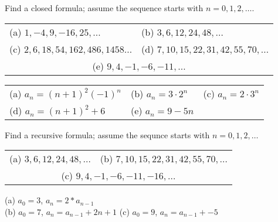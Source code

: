 \documentclass[11pt,addpoints]{exam}
\begin{document}
\begin{questions}
\question[10] Find a closed formula; assume the sequence starts with $n=0, 1, 2, \ldots$.

\begin{tabular}{ll}
	(a) $1, -4, 9, -16, 25, \ldots$ 
		& (b) $3, 6, 12, 24, 48, \ldots$ \\
	(c) $2, 6, 18, 54, 162, 486, 1458\ldots$  \hspace{0.3in}
		& (d) $7, 10, 15, 22, 31, 42, 55, 70, \ldots$ \\
	\multicolumn{2}{c}{(e) $9, 4, -1, -6, -11, \ldots$ }
\end{tabular}
    \ifprintanswers
        \vspace{-10pt}
   \fi
\begin{solution}
	
	\begin{tabular}{lll}
		(a) $a_n = (n+1)^2 (-1)^n$ \hspace{0.6in}
			& (b) $a_n = 3\cdot 2^n$ \hspace{0.6in}
			& (c) $a_n = 2\cdot 3^n$ \\
		(d) $a_n = (n+1)^2 + 6$
			& (e) $a_n = 9 - 5n$
	\end{tabular}
\end{solution}


\question[6] Find a recursive formula; assume the sequnce starts with $n=0,1,2,\ldots$

\begin{tabular}{ll}
	(a) $3, 6, 12, 24, 48, \ldots$  \hspace{0.3in}
		& (b) $7, 10, 15, 22, 31, 42, 55, 70, \ldots$\\
	\multicolumn{2}{c}{(c) $9, 4, -1, -6, -11, -16, \ldots$}
\end{tabular}
    \ifprintanswers
        \vspace{-10pt}
   \fi
\begin{solution}
	(a) $a_0 = 3$, $a_n = 2*a_{n-1}$ \\
	(b)  $a_0 = 7$, $a_n = a_{n-1} + 2n + 1$  
		\hspace{0.6in} (c) $a_0 = 9$, $a_n = a_{n-1} + -5$
\end{solution}



\end{questions}
\end{document}
